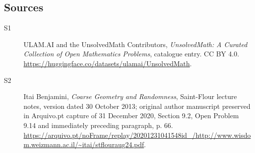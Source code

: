 \documentclass[11pt]{article}
\begin{document}
\subsection{Sources}
\begin{description}
\item[\hypertarget{source:statement:1}{S1}] ULAM.AI and the UnsolvedMath Contributors, \emph{UnsolvedMath: A Curated Collection of Open Mathematics Problems}, catalogue entry. CC BY 4.0. \url{https://huggingface.co/datasets/ulamai/UnsolvedMath}.
\item[\hypertarget{source:statement:2}{S2}] Itai Benjamini, \emph{Coarse Geometry and Randomness}, Saint-Flour lecture notes, version dated 30 October 2013; original author manuscript preserved in Arquivo.pt capture of 31 December 2020, Section 9.2, Open Problem 9.14 and immediately preceding paragraph, p. 66. \url{https://arquivo.pt/noFrame/replay/20201231041548id_/http://www.wisdom.weizmann.ac.il/~itai/stflouraug24.pdf}.
\end{description}
\label{end:statement}
\end{document}
